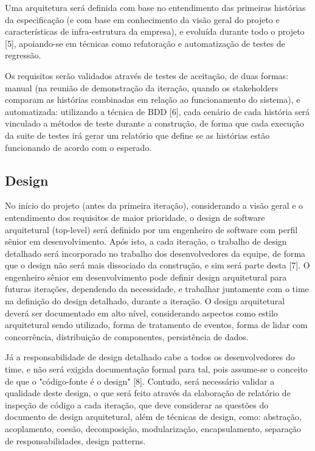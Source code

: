 \documentclass[12pt,journal,compsoc]{IEEEtran}
\begin{document}
Uma arquitetura será definida com base no entendimento das primeiras histórias da especificação (e com base em conhecimento da visão geral do projeto e características de infra-estrutura da empresa), e evoluída durante todo o projeto [5], apoiando-se em técnicas como refatoração e automatização de testes de regressão.

Os requisitos serão validados através de testes de aceitação, de duas formas: manual (na reunião de demonstração da iteração, quando os stakeholders comparam as histórias combinadas em relação ao funcionamento do sistema), e automatizada: utilizando a técnica de BDD [6], cada cenário de cada história será vinculado a métodos de teste durante a construção, de forma que cada execução da suite de testes irá gerar um relatório que define se as histórias estão funcionando de acordo com o esperado.


\subsection{Design}

No início do projeto (antes da primeira iteração), considerando a visão geral e o entendimento dos requisitos de maior prioridade, o design de software arquitetural (top-level) será definido por um engenheiro de software com perfil sênior em desenvolvimento. Após isto, a cada iteração, o trabalho de design detalhado será incorporado no trabalho dos desenvolvedores da equipe, de forma que o design não será mais dissociado da construção, e sim será parte desta [7]. O engenheiro sênior em desenvolvimento pode definir design arquitetural para futuras iterações, dependendo da necessidade, e trabalhar juntamente com o time na definição do design detalhado, durante a iteração. O design arquitetural deverá ser documentado em alto nível, considerando aspectos como estilo arquitetural sendo utilizado, forma de tratamento de eventos, forma de lidar com concorrência, distribuição de componentes, persistência de dados.

Já a responsabilidade de design detalhado cabe a todos os desenvolvedores do time, e não será exigida documentação formal para tal, pois assume-se o conceito de que o "código-fonte é o design" [8]. Contudo, será necessário validar a qualidade deste design, o que será feito através da elaboração de relatório de inspeção de código a cada iteração, que deve considerar as questões do documento de design arquitetural, além de técnicas de design, como: abstração, acoplamento, coesão, decomposição, modularização, encapsulamento, separação de responsabilidades, design patterns. 
\end{document}
